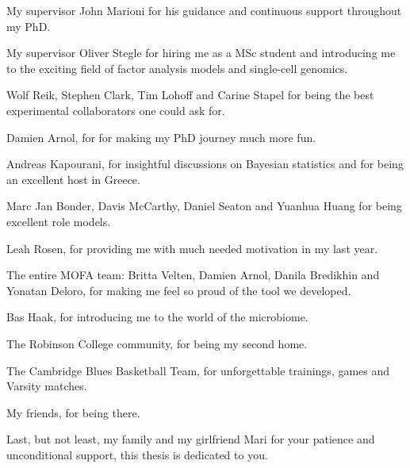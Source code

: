 
\begin{acknowledgements}

My supervisor John Marioni for his guidance and continuous support throughout my PhD.

My supervisor Oliver Stegle for hiring me as a MSc student and introducing me to the exciting field of factor analysis models and single-cell genomics. 

Wolf Reik, Stephen Clark, Tim Lohoff and Carine Stapel for being the best experimental collaborators one could ask for. 

Damien Arnol, for for making my PhD journey much more fun.

Andreas Kapourani, for insightful discussions on Bayesian statistics and for being an excellent host in Greece. 

Marc Jan Bonder, Davis McCarthy, Daniel Seaton and Yuanhua Huang for being excellent role models.

Leah Rosen, for providing me with much needed motivation in my last year.

The entire MOFA team: Britta Velten, Damien Arnol, Danila Bredikhin and Yonatan Deloro, for making me feel so proud of the tool we developed.

Bas Haak, for introducing me to the world of the microbiome.

The Robinson College community, for being my second home.

The Cambridge Blues Basketball Team, for unforgettable trainings, games and Varsity matches.

My friends, for being there.

Last, but not least, my family and my girlfriend Mari for your patience and unconditional support, this thesis is dedicated to you.

\end{acknowledgements}
